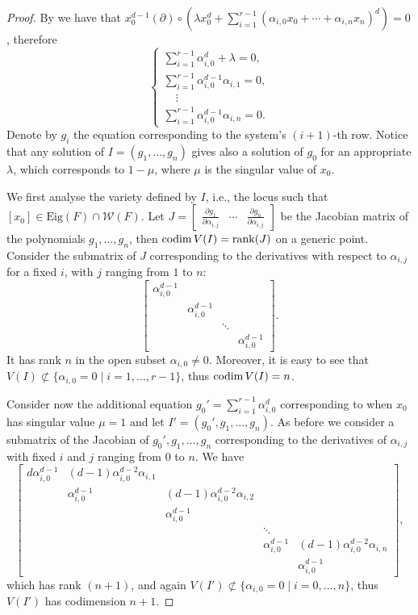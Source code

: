 \documentclass{amsart}
\numberwithin{theorem}{section}
\theoremstyle{definition}
\newcommand{\Eig}{\mathrm{Eig}}
\newcommand{\codim}{\mathop{\rm codim}\nolimits}
\begin{document}
\begin{proof}
    By  we have that $x_0^{d-1}(\partial)\circ (\lambda x_0^d+\sum_{i=1}^{r-1} (\alpha_{i,0}x_0+\cdots +\alpha_{i,n}x_n)^d)=0$,  therefore $$
    \begin{cases}
        \sum_{i=1}^{r-1}\alpha_{i,0}^d+\lambda=0,\\
        \sum_{i=1}^{r-1} \alpha_{i,0}^{d-1}\alpha_{i,1}=0,\\
        \ \ \ \ \  \vdots\\
        \sum_{i=1}^{r-1} \alpha_{i,0}^{d-1}\alpha_{i,n}=0.
    \end{cases}
    $$
    Denote by $g_i$ the equation corresponding to the system's $(i+1)$-th row. Notice that any solution of $I=(g_1,\dots, g_n)$ gives also a solution of $g_0$ for an appropriate $\lambda$, which corresponds to $1-\mu$, where $\mu$ is the singular value of $x_0$. 
    
    We first analyse the variety defined by $I$, i.e., the locus such that $[x_0]\in\Eig(F)\cap \mathcal W(F)$. Let $
    J=\begin{bmatrix}
        \frac{\partial g_1}{\partial \alpha_{i,j}}&\cdots& \frac{\partial g_n}{\partial \alpha_{i,j}} 
    \end{bmatrix}
    $ be the Jacobian matrix of the polynomials $g_1,\dots,g_n$, then $\codim V(I)=\mathrm{rank} (J)$ on a generic point. Consider the submatrix of $J$ corresponding to the derivatives with respect to $\alpha_{i,j}$ for a fixed $i$, with $j$ ranging from $1$ to $n$:
    $$
    \begin{bmatrix}
        \alpha_{i,0}^{d-1}\\
        &\alpha_{i,0}^{d-1}\\
        &&\ddots\\
        &&&\alpha_{i,0}^{d-1}
    \end{bmatrix}.
    $$
  It has rank $n$ in the open subset $\alpha_{i,0}\neq0$. Moreover, it is easy to see that $V(I)\not\subset \{\alpha_{i,0}=0\mid i=1,\dots,r-1\}$, thus $\codim V(I)=n$.

    Consider now the additional equation $g_0'=\sum_{i=1}^{r-1}\alpha_{i,0}^d$ corresponding to when $x_0$ has singular value $\mu=1$ and let $I'=(g_0',g_1,\dots,g_n)$. As before we consider a submatrix of the Jacobian of $g_0',g_1,\dots,g_n$  corresponding to the derivatives of $\alpha_{i,j}$ with fixed $i$ and $j$ ranging from $0$ to $n$. We have
$$
    \begin{bmatrix}
        d\alpha_{i,0}^{d-1}&(d-1)\alpha_{i,0}^{d-2}\alpha_{i,1}\\
        &\alpha_{i,0}^{d-1}&(d-1)\alpha_{i,0}^{d-2}\alpha_{i,2}\\
        &&\alpha_{i,0}^{d-1}\\
        &&&\ddots\\
        
        &&&\alpha_{i,0}^{d-1}&(d-1)\alpha_{i,0}^{d-2}\alpha_{i,n}\\
        &&&&\alpha_{i,0}^{d-1}
    \end{bmatrix},
$$
which has rank $(n+1)$, and again $V(I')\not\subset \{\alpha_{i,0}=0\mid i=0,\dots,n\}$, thus $V(I')$ has codimension $n+1$.
\end{proof}
\end{document}

